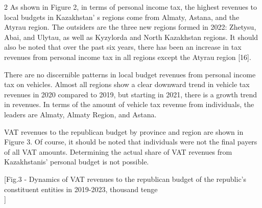 \begin{multicols}{2}
As shown in Figure 2, in terms of personal income tax, the highest
revenues to local budgets in Kazakhstan' s regions come
from Almaty, Astana, and the Atyrau region. The outsiders are the three
new regions formed in 2022: Zhetysu, Abai, and Ulytau, as well as
Kyzylorda and North Kazakhstan regions. It should also be noted that
over the past six years, there has been an increase in tax revenues from
personal income tax in all regions except the Atyrau region {[}16{]}.

There are no discernible patterns in local budget revenues from personal
income tax on vehicles. Almost all regions show a clear downward trend
in vehicle tax revenues in 2020 compared to 2019, but starting in 2021,
there is a growth trend in revenues. In terms of the amount of vehicle
tax revenue from individuals, the leaders are Almaty, Almaty Region, and
Astana.

VAT revenues to the republican budget by province and region are shown
in Figure 3. Of course, it should be noted that individuals were not the
final payers of all VAT amounts. Determining the actual share of VAT
revenues from Kazakhstanis' personal budget is not possible.
\end{multicols}

[Fig.3 - Dynamics of VAT revenues to the republican budget of
the republic's constituent entities in 2019-2023,
thousand tenge\\]

